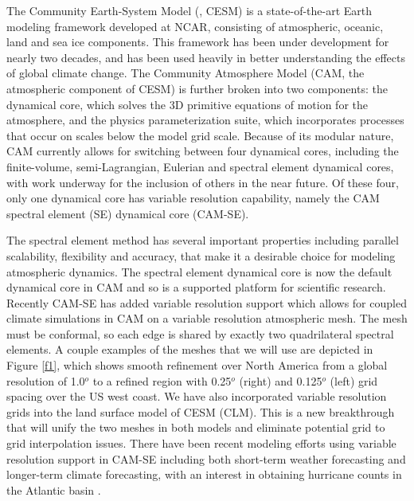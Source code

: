 \documentclass[11pt]{article}
\begin{document}
The Community Earth-System Model (\citet{hurrell2013community}, CESM) is a state-of-the-art Earth modeling framework developed at NCAR, consisting of atmospheric, oceanic, land and sea ice components. This framework has been under development for nearly two decades, and has been used heavily in better understanding the effects of global climate change. The Community Atmosphere Model (CAM, the atmospheric component of CESM) is further broken into two components: the dynamical core, which solves the 3D primitive equations of motion for the atmosphere, and the physics parameterization suite, which incorporates processes that occur on scales below the model grid scale. Because of its modular nature, CAM currently allows for switching between four dynamical cores, including the finite-volume, semi-Lagrangian, Eulerian and spectral element dynamical cores, with work underway for the inclusion of others in the near future. Of these four, only one dynamical core has variable resolution capability, namely the CAM spectral element (SE) dynamical core (CAM-SE).

The spectral element method has several important properties including parallel scalability, flexibility and accuracy, that make it a desirable choice for modeling atmospheric dynamics. The spectral element dynamical core \citet{fournier2004spectral, taylor2010compatible} is now the default dynamical core in CAM and so is a supported platform for scientific research. Recently CAM-SE has added variable resolution support which allows for coupled climate simulations in CAM on a variable resolution atmospheric mesh. The mesh must be conformal, so each edge is shared by exactly two quadrilateral spectral elements. A couple examples of the meshes that we will use are depicted in Figure \ref{f1}, which shows smooth refinement over North America from a global resolution of 1.0$^{o}$ to a refined region with 0.25$^{o}$ (right) and 0.125$^{o}$ (left) grid spacing over the US west coast.  We have also incorporated variable resolution grids into the land surface model of CESM (CLM).  This is a new breakthrough that will unify the two meshes in both models and eliminate potential grid to grid interpolation issues.  There have been recent modeling efforts using variable resolution support in CAM-SE including both short-term weather forecasting and longer-term climate forecasting, with an interest in obtaining hurricane counts in the Atlantic basin \citep{zarzycki2014using}.
\end{document}
